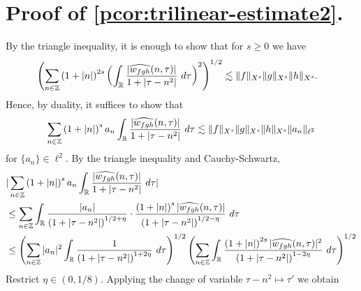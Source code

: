 \section{Proof of \cref{pcor:trilinear-estimate2}.}
By the triangle inequality, it is enough to show that
for $s \ge 0$ we have
%
%
\begin{equation}
  \begin{split}
    & \left( \sum_{n \in \mathbb{Z}} \left (1 + |n| \right )^{2s}  \left ( \int_{\mathbb{R}} 
    \frac{|\widehat{{w}_{fgh}}(n, \tau) |}{1 + | \tau - n^{2} |}
     \ d\tau \right)^2  \right)^{1/2} 
     \lesssim \|f\|_{X^s} \| g\|_{X^s}
    \| h \|_{X^s}.
  \end{split}
\end{equation}
%
Hence, by duality, it suffices to show that 
%
\begin{equation*}
  \begin{split}
    \sum_{n \in \mathbb{Z}} \left (1 + |n| \right )^{s}
    a_n \int_{\mathbb{R}} \frac{|\widehat{{w}_{fgh}}(n, \tau)|}{1 
    + | \tau - n^{2} |} \ d \tau \lesssim \|f\|_{X^s} \|g\|_{X^s} \|h\|_{X^s}
    \|a_n \|_{\ell^2}
  \end{split}
\end{equation*}
%
for $\{a_n\} \in \ell^2$. By the triangle inequality 
and Cauchy-Schwartz,
%
\begin{equation}
  \label{p1m}
  \begin{split}
    & | \sum_{n \in \zz} \left (1 + |n| \right )^{s} a_n
    \int_{\rr}\frac{| \wh{{w}_{fgh}}(n, \tau) |}{1 + | \tau - n^{2} |} \ d \tau |
    \\
    & \le \sum_{n \in \zz} \int_{\rr} \frac{| a_n |}{\left( 1 + 
    | \tau - n^{2} |
    \right)^{1/2 + \eta}} \cdot \frac{\left( 1 + | n| \right)^s  |
    \wh{{w}_{fgh}}(n, \tau) |}{\left( 
    1 + | \tau - n^{2} | \right)^{1/2 - \eta}} \ d \tau
    \\
    & \le \left( \sum_{n \in \zz} | a_{n} |^2\int_{\rr} \frac{1}{\left( 1 + | \tau - n^{2} | \right)^{1 + 2 \eta}} \ d \tau  
    \right)^{1/2} 
    \left ( \sum_{n \in \zz}\int_{\rr} \frac{\left (1 + |n| \right )^{2s} | \wh{{w}_{fgh}}(n, \tau) 
    |^2}{\left( 1 + | \tau - n^{2} | \right)^{1 - 2 \eta}}\ d \tau 
    \right)^{1/2}
  \end{split}
\end{equation}
%
Restrict $\eta \in (0, 1/8)$. Applying the change of variable $\tau - n^{2}
\mapsto \tau'$ we obtain  %

